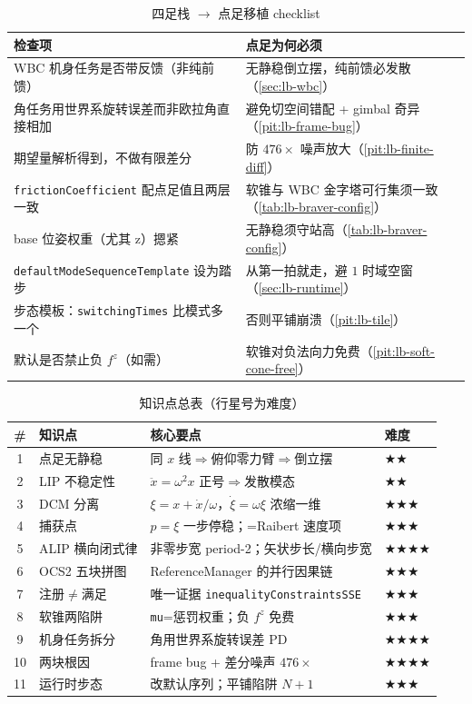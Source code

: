 \begin{table}[H]\centering\small
\caption{四足栈 $\to$ 点足移植 checklist}
\begin{tabular}{p{} p{}}
\toprule
检查项 & 点足为何必须 \\
\midrule
WBC 机身任务是否带反馈（非纯前馈） & 无静稳倒立摆，纯前馈必发散（\cref{sec:lb-wbc}） \\
角任务用世界系旋转误差而非欧拉角直接相加 & 避免切空间错配 + gimbal 奇异（\cref{pit:lb-frame-bug}） \\
期望量解析得到，不做有限差分 & 防 $476\times$ 噪声放大（\cref{pit:lb-finite-diff}） \\
\texttt{frictionCoefficient} 配点足值且两层一致 & 软锥与 WBC 金字塔可行集须一致（\cref{tab:lb-braver-config}） \\
base 位姿权重（尤其 z）摁紧 & 无静稳须守站高（\cref{tab:lb-braver-config}） \\
\texttt{defaultModeSequenceTemplate} 设为踏步 & 从第一拍就走，避 $1$ 时域空窗（\cref{sec:lb-runtime}） \\
步态模板：\texttt{switchingTimes} 比模式多一个 & 否则平铺崩溃（\cref{pit:lb-tile}） \\
默认是否禁止负 $f^z$（如需） & 软锥对负法向力免费（\cref{pit:lb-soft-cone-free}） \\
\bottomrule
\end{tabular}
\end{table}

\begin{table}[H]\centering\small
\caption{知识点总表（行星号为难度）}
\begin{tabular}{clll}
\toprule
\# & 知识点 & 核心要点 & 难度 \\
\midrule
1 & 点足无静稳 & 同 $x$ 线$\Rightarrow$俯仰零力臂$\Rightarrow$倒立摆 & \(\bigstar\bigstar\) \\
2 & LIP 不稳定性 & $\ddot x=\omega^2 x$ 正号$\Rightarrow$发散模态 & \(\bigstar\bigstar\) \\
3 & DCM 分离 & $\xi=x+\dot x/\omega$，$\dot\xi=\omega\xi$ 浓缩一维 & \(\bigstar\bigstar\bigstar\) \\
4 & 捕获点 & $p=\xi$ 一步停稳；=Raibert 速度项 & \(\bigstar\bigstar\bigstar\) \\
5 & ALIP 横向闭式律 & 非零步宽 period-2；矢状步长/横向步宽 & \(\bigstar\bigstar\bigstar\bigstar\) \\
6 & OCS2 五块拼图 & ReferenceManager 的并行因果链 & \(\bigstar\bigstar\bigstar\) \\
7 & 注册$\ne$满足 & 唯一证据 \texttt{inequalityConstraintsSSE} & \(\bigstar\bigstar\bigstar\) \\
8 & 软锥两陷阱 & \texttt{mu}=惩罚权重；负 $f^z$ 免费 & \(\bigstar\bigstar\bigstar\) \\
9 & 机身任务拆分 & 角用世界系旋转误差 PD & \(\bigstar\bigstar\bigstar\bigstar\) \\
10 & 两块根因 & frame bug + 差分噪声 $476\times$ & \(\bigstar\bigstar\bigstar\bigstar\) \\
11 & 运行时步态 & 改默认序列；平铺陷阱 $N{+}1$ & \(\bigstar\bigstar\bigstar\) \\
\bottomrule
\end{tabular}
\end{table}

